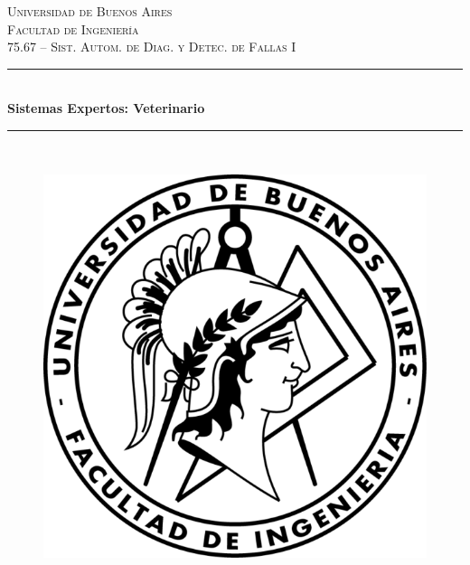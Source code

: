 \begin{titlepage}

\newcommand{\HRule}{\rule{\linewidth}{0.5mm}} %

\center %
 

\textsc{\LARGE Universidad de Buenos Aires}\\[0.5cm] %
\textsc{\Large Facultad de Ingeniería}\\[1.5cm] %
\textsc{\large 75.67 – Sist. Autom. de Diag. y Detec. de Fallas I}\\[0.5cm] %


\HRule \\[0.4cm]
{ \LARGE \bfseries Sistemas Expertos: Veterinario}\\[0.2cm]
\HRule \\[1.5cm]
 

\begin{figure}
\centering
\includegraphics[scale=0.95]{./img/logo-facu}
\end{figure}  



\end{titlepage}
